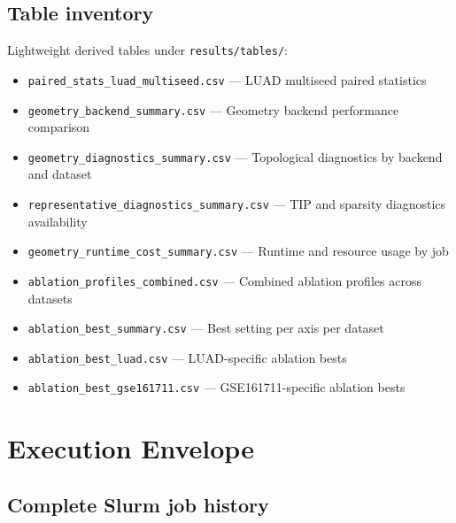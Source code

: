 \documentclass[11pt]{article}
\begin{document}
\subsection{Table inventory}
Lightweight derived tables under \texttt{results/tables/}:
\begin{itemize}[leftmargin=1.5em]
\item \texttt{paired\_stats\_luad\_multiseed.csv} --- LUAD multiseed paired statistics
\item \texttt{geometry\_backend\_summary.csv} --- Geometry backend performance comparison
\item \texttt{geometry\_diagnostics\_summary.csv} --- Topological diagnostics by backend and dataset
\item \texttt{representative\_diagnostics\_summary.csv} --- TIP and sparsity diagnostics availability
\item \texttt{geometry\_runtime\_cost\_summary.csv} --- Runtime and resource usage by job
\item \texttt{ablation\_profiles\_combined.csv} --- Combined ablation profiles across datasets
\item \texttt{ablation\_best\_summary.csv} --- Best setting per axis per dataset
\item \texttt{ablation\_best\_luad.csv} --- LUAD-specific ablation bests
\item \texttt{ablation\_best\_gse161711.csv} --- GSE161711-specific ablation bests
\end{itemize}

\section{Execution Envelope}
\label{sec:execution}

\subsection{Complete Slurm job history}
\end{document}
